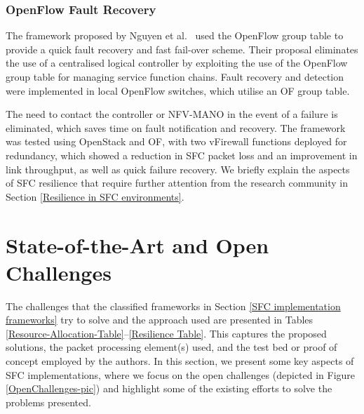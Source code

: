 \documentclass[futureinternet,review,accept,pdftex,moreauthors]{Definitions/mdpi}
\begin{document}
\subsubsection{OpenFlow Fault Recovery}
\label{OpenFlow-Fault}
The framework proposed by Nguyen {et al.}~\cite{nguyen2019openflow} used the OpenFlow group table to provide a quick fault recovery and fast fail-over scheme. Their proposal eliminates the use of a centralised logical controller by exploiting the use of the OpenFlow group table for managing service function chains. Fault recovery and detection were implemented in local OpenFlow switches, which utilise an OF group table. 

The need to contact the controller or NFV-MANO in the event of a failure is eliminated, which saves time on fault notification and recovery. The framework was tested using OpenStack and OF, with two vFirewall functions deployed for redundancy, which showed a reduction in SFC packet loss and an improvement in link throughput, as well as quick failure recovery. 
We briefly explain the aspects of SFC resilience that require further attention from the research community in Section \ref{Resilience in SFC environments}. 





\section{State-of-the-Art and Open Challenges}
\label{Open-challenges}
The challenges that the classified frameworks in Section \ref{SFC implementation frameworks} try to solve and the approach used are presented in Tables   \ref{Resource-Allocation-Table}--\ref{Resilience Table}. This captures the proposed solutions, the packet processing element(s) used, and the test bed or proof of concept employed by the authors. In this section, we present some key aspects of SFC implementations, where we focus on the open challenges (depicted in Figure \ref{OpenChallenges-pic}) and highlight some of the existing efforts to solve the problems presented.
\end{document}
